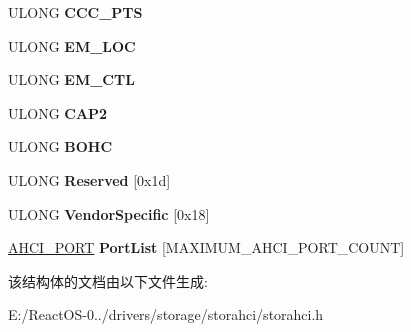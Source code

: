 \begin{DoxyCompactItemize}
U\+L\+O\+NG {\bfseries C\+C\+C\+\_\+\+P\+TS}
\item 
\mbox{\label{struct___a_h_c_i___m_e_m_o_r_y___r_e_g_i_s_t_e_r_s_a032ee90f58702749abaadc438f2e43d6}} 
U\+L\+O\+NG {\bfseries E\+M\+\_\+\+L\+OC}
\item 
\mbox{\label{struct___a_h_c_i___m_e_m_o_r_y___r_e_g_i_s_t_e_r_s_ae802bcabdc17670c6f7ac62bd53a1e3e}} 
U\+L\+O\+NG {\bfseries E\+M\+\_\+\+C\+TL}
\item 
\mbox{\label{struct___a_h_c_i___m_e_m_o_r_y___r_e_g_i_s_t_e_r_s_a210c255222f8399a05b8a21fe2b62b46}} 
U\+L\+O\+NG {\bfseries C\+A\+P2}
\item 
\mbox{\label{struct___a_h_c_i___m_e_m_o_r_y___r_e_g_i_s_t_e_r_s_af4d65fc638f8ef9ad91de333b415edb5}} 
U\+L\+O\+NG {\bfseries B\+O\+HC}
\item 
\mbox{\label{struct___a_h_c_i___m_e_m_o_r_y___r_e_g_i_s_t_e_r_s_ab7633f94e00137092f18319d871d0361}} 
U\+L\+O\+NG {\bfseries Reserved} \mbox{[}0x1d\mbox{]}
\item 
\mbox{\label{struct___a_h_c_i___m_e_m_o_r_y___r_e_g_i_s_t_e_r_s_ae6b9f6b63b84c276b901ae970d6a4a03}} 
U\+L\+O\+NG {\bfseries Vendor\+Specific} \mbox{[}0x18\mbox{]}
\item 
\mbox{\label{struct___a_h_c_i___m_e_m_o_r_y___r_e_g_i_s_t_e_r_s_aaa7d8a95466342cf9dc6a56f8a731746}} 
\hyperlink{struct___a_h_c_i___p_o_r_t}{A\+H\+C\+I\+\_\+\+P\+O\+RT} {\bfseries Port\+List} \mbox{[}M\+A\+X\+I\+M\+U\+M\+\_\+\+A\+H\+C\+I\+\_\+\+P\+O\+R\+T\+\_\+\+C\+O\+U\+NT\mbox{]}
\end{DoxyCompactItemize}


该结构体的文档由以下文件生成\+:\begin{DoxyCompactItemize}
\item 
E\+:/\+React\+O\+S-\/0../drivers/storage/storahci/storahci.\+h\end{DoxyCompactItemize}

